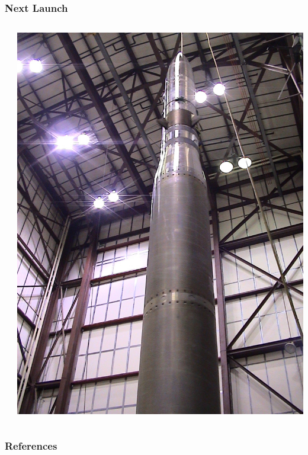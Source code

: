 \documentclass[landscape,xcolor={table}]{beamer}
\begin{document}
	\begin{frame}
		
		\frametitle{Next Launch}
		
		\begin{columns}[T] %
		\begin{column}{.49\textwidth}

			
			
		\end{column}%
		\hfill%
		\begin{column}{.49\textwidth}

			\includegraphics[width=\textwidth]{images/high}
					
		\end{column}%
		\end{columns}

	\end{frame}
	
	\begin{frame}
		\frametitle{References}
		
		
		
	\end{frame}
	
\end{document}
